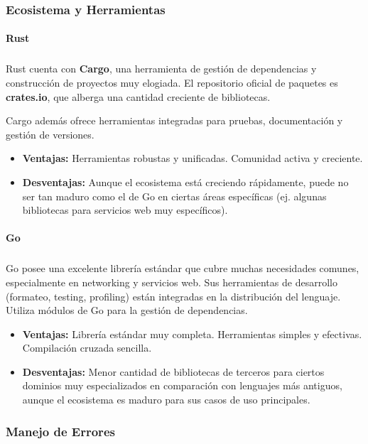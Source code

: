 \subsubsection{Ecosistema y Herramientas}
\paragraph{Rust}
\subparagraph{}

Rust cuenta con \textbf{Cargo}, una herramienta de gestión de dependencias y construcción de proyectos muy elogiada. El repositorio oficial de paquetes es \textbf{crates.io}, que alberga una cantidad creciente de bibliotecas.

Cargo además ofrece herramientas integradas para pruebas, documentación y gestión de versiones.
\begin{itemize}
    \item \textbf{Ventajas:} Herramientas robustas y unificadas. Comunidad activa y creciente.
    \item \textbf{Desventajas:} Aunque el ecosistema está creciendo rápidamente, puede no ser tan maduro como el de Go en ciertas áreas específicas (ej. algunas bibliotecas para servicios web muy específicos).
\end{itemize}

\paragraph{Go}
\subparagraph{}

Go posee una excelente librería estándar que cubre muchas necesidades comunes, especialmente en networking y servicios web. Sus herramientas de desarrollo (formateo, testing, profiling) están integradas en la distribución del lenguaje. Utiliza módulos de Go para la gestión de dependencias.
\begin{itemize}
    \item \textbf{Ventajas:} Librería estándar muy completa. Herramientas simples y efectivas. Compilación cruzada sencilla.
    \item \textbf{Desventajas:} Menor cantidad de bibliotecas de terceros para ciertos dominios muy especializados en comparación con lenguajes más antiguos, aunque el ecosistema es maduro para sus casos de uso principales.
\end{itemize}

\subsubsection{Manejo de Errores}
